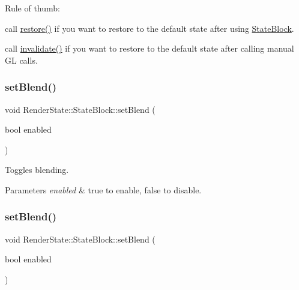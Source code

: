 Rule of thumb\+:


\begin{DoxyItemize}
\item call {\ttfamily \hyperlink{classRenderState_1_1StateBlock_aa8ce56d1294d4afd7908fa6de4ea00d8}{restore()}} if you want to restore to the default state after using {\ttfamily \hyperlink{classRenderState_1_1StateBlock}{State\+Block}}.
\item call {\ttfamily \hyperlink{classRenderState_1_1StateBlock_a05ce75099029c8cc41f96328df911bd0}{invalidate()}} if you want to restore to the default state after calling manual GL calls. 
\end{DoxyItemize}\mbox{\label{classRenderState_1_1StateBlock_a39bd0858d8bb963f844805f32693b681}} 
\subsubsection{\texorpdfstring{set\+Blend()}{setBlend()}\hspace{0.1cm}{\footnotesize\ttfamily [1/2]}}
{\footnotesize\ttfamily void Render\+State\+::\+State\+Block\+::set\+Blend (\begin{DoxyParamCaption}\item[{bool}]{enabled }\end{DoxyParamCaption})}

Toggles blending.


\begin{DoxyParams}{Parameters}
{\em enabled} & true to enable, false to disable. \\
\hline
\end{DoxyParams}
\mbox{\label{classRenderState_1_1StateBlock_a39bd0858d8bb963f844805f32693b681}} 
\subsubsection{\texorpdfstring{set\+Blend()}{setBlend()}\hspace{0.1cm}{\footnotesize\ttfamily [2/2]}}
{\footnotesize\ttfamily void Render\+State\+::\+State\+Block\+::set\+Blend (\begin{DoxyParamCaption}\item[{bool}]{enabled }\end{DoxyParamCaption})}

